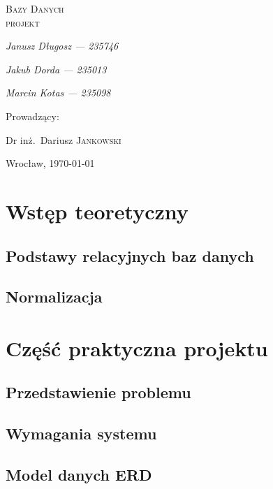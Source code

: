 \documentclass[polish, 11pt]{article}
\begin{document}
\begin{titlepage}
    \centering
    {\scshape\LARGE Bazy Danych\\ projekt \par}
    \vspace{1cm}
   
    {\itshape\Large Janusz Długosz --- 235746\/\par}
    {\itshape\Large Jakub Dorda --- 235013\/\par}
    {\itshape\Large Marcin Kotas --- 235098\/\par}
    \vfill
    Prowadzący:\par
    Dr inż.~Dariusz \textsc{Jankowski}

    \vfill

    {\large Wrocław, \today\par}

\end{titlepage}

\tableofcontents
\newpage

\section{Wstęp teoretyczny}
    \subsection{Podstawy relacyjnych baz danych}

    \subsection{Normalizacja}

\section{Część praktyczna projektu}
    \subsection{Przedstawienie problemu}

    \subsection{Wymagania systemu}
    
    \subsection{Model danych ERD}
\end{document}
